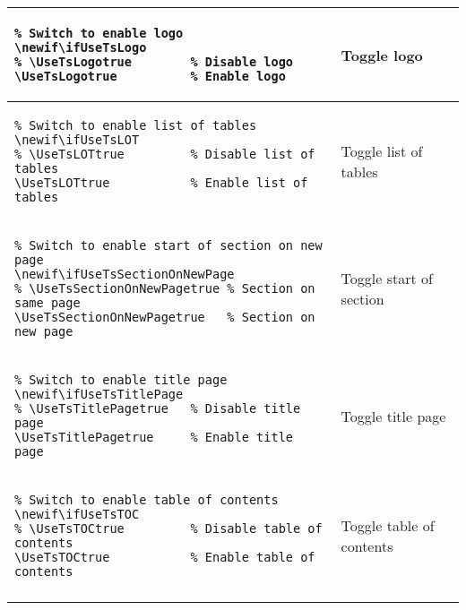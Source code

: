 \begin{footnotesize}
\begin{longtable}{ | P{0.7\textwidth} | p{0.2\textwidth} | }
        \hline
        \begin{BVerbatim}
\newif\ifUseTsLogo
\UseTsLogotrue          %
        \end{BVerbatim}
         & Toggle logo                       \\
        \hline
        \begin{BVerbatim}
\newif\ifUseTsLOT
\UseTsLOTtrue           %
        \end{BVerbatim}
         & Toggle list \newline of tables    \\
        \hline
        \begin{BVerbatim}
\newif\ifUseTsSectionOnNewPage
\UseTsSectionOnNewPagetrue   %
        \end{BVerbatim}
         & Toggle start \newline of section  \\
        \hline
        \begin{BVerbatim}
\newif\ifUseTsTitlePage
\UseTsTitlePagetrue     %
        \end{BVerbatim}
         & Toggle title page                 \\
        \hline
        \begin{BVerbatim}
\newif\ifUseTsTOC
\UseTsTOCtrue           %
        \end{BVerbatim}
         & Toggle table \newline of contents \\
        \hline
    \end{longtable}
\end{footnotesize}

